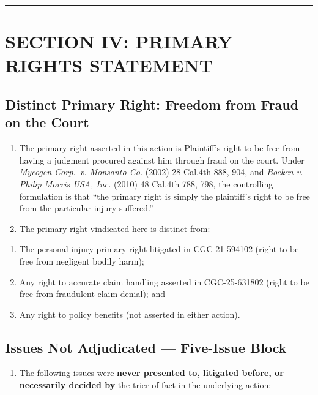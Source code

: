\begin{center}\rule{0.5\linewidth}{0.5pt}\end{center}

\label{toc:section-iv-primary-rights-statement}
\section{SECTION IV: PRIMARY RIGHTS STATEMENT}\label{section-iv-primary-rights-statement}

\subsection{Distinct Primary Right: Freedom from Fraud on the Court}\label{distinct-primary-right-freedom-from-fraud-on-the-court}

\begin{enumerate}
\def\labelenumi{\arabic{enumi}.}
\setcounter{enumi}{21}
\item
  The primary right asserted in this action is Plaintiff's right to be free from having a judgment procured against him through fraud on the court. Under \emph{Mycogen Corp.~v. Monsanto Co.} (2002) 28 Cal.4th 888, 904, and \emph{Boeken v. Philip Morris USA, Inc.} (2010) 48 Cal.4th 788, 798, the controlling formulation is that ``the primary right is simply the plaintiff's right to be free from the particular injury suffered.''
\item
  The primary right vindicated here is distinct from:
\end{enumerate}

\begin{enumerate}
\def\labelenumi{(\alph{enumi})}
\item
  The personal injury primary right litigated in CGC-21-594102 (right to be free from negligent bodily harm);
\item
  Any right to accurate claim handling asserted in CGC-25-631802 (right to be free from fraudulent claim denial); and
\item
  Any right to policy benefits (not asserted in either action).
\end{enumerate}

\subsection{Issues Not Adjudicated --- Five-Issue Block}\label{issues-not-adjudicated-five-issue-block}

\begin{enumerate}
\def\labelenumi{\arabic{enumi}.}
\setcounter{enumi}{23}
\tightlist
\item
  The following issues were \textbf{never presented to, litigated before, or necessarily decided by} the trier of fact in the underlying action:
\end{enumerate}

